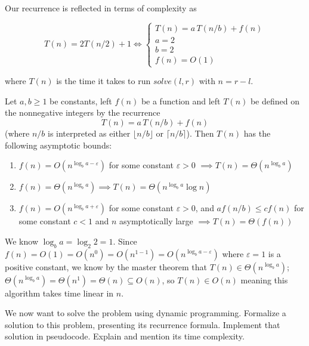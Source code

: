 \documentclass{cal}
\begin{document}
{\newpage
Our recurrence is reflected in terms of complexity as

\begin{equation*}
    T(n) = 2T(n/2) + 1 \iff \begin{cases}
        T(n) = a\,T(n/b) + f(n) \\
        a = 2 \\
        b = 2 \\
        f(n) = O(1)
    \end{cases}
\end{equation*}

where $T(n)$ is the time it takes to run $solve(l, r)$ with $n = r-l$.

\begin{theorem}
    Let $a, b \geq 1$ be constants, left $f(n)$ be a function and left $T(n)$ be defined on the nonnegative integers by the recurrence
    \begin{equation*}
        T(n) = a\,T(n/b) + f(n)
    \end{equation*}
    (where $n/b$ is interpreted as either $\lfloor n/b \rfloor$ or $\lceil n/b \rceil$). Then $T(n)$ has the following asymptotic bounds:
    \begin{enumerate}
        \item $f(n) = O(n^{\log_b{a} - \varepsilon})$ for some constant $\varepsilon > 0$ $\implies T(n) = \Theta(n^{\log_b{a}})$
        \item $f(n) = \Theta(n^{\log_b{a}}) \implies T(n) = \Theta(n^{\log_b{a}} \log{n})$
        \item $f(n) = O(n^{\log_b{a} + \varepsilon})$ for some constant $\varepsilon > 0$, and $a f(n/b) \leq c f(n)$ for some constant $c < 1$ and $n$ asymptotically large $\implies T(n) = \Theta(f(n))$
    \end{enumerate}
\end{theorem}


We know $\log_b{a} = \log_2{2} = 1$. Since $f(n) = O(1) = O(n^0) = O(n^{1-1}) = O(n^{\log_b{a}-\varepsilon})$ where $\varepsilon = 1$ is a positive constant, we know by the master theorem that $T(n) \in \Theta (n^{\log_b{a}})$; $\Theta (n^{\log_b{a}}) = \Theta (n^1) = \Theta(n) \subseteq O(n)$, so $T(n) \in O(n)$ meaning this algorithm takes time linear in $n$.

We now want to solve the problem using dynamic programming. Formalize a solution to this problem, presenting its recurrence formula. Implement that solution in pseudocode. Explain and mention its time complexity.

}
\end{document}
